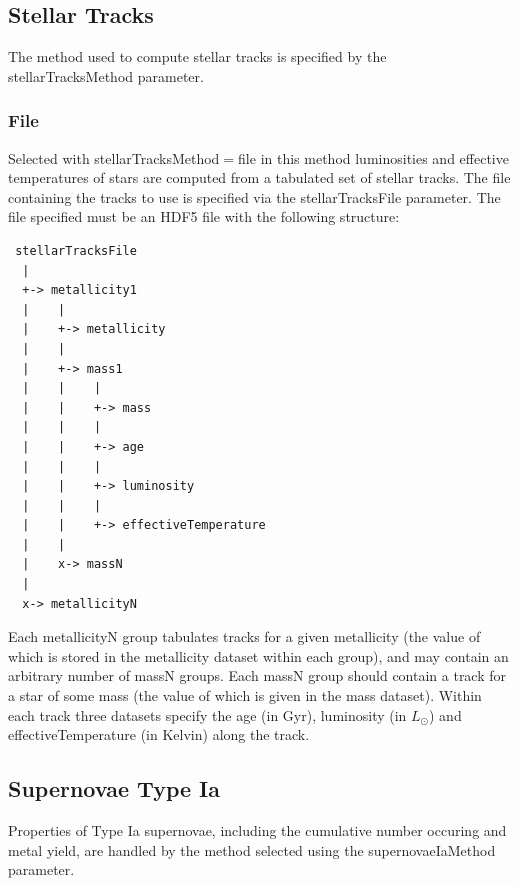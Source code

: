 \subsection{Stellar Tracks}

The method used to compute stellar tracks is specified by the {\normalfont \ttfamily stellarTracksMethod} parameter.

\subsubsection{File}\label{sec:StellarTracksFile}

Selected with {\normalfont \ttfamily stellarTracksMethod}$=${\normalfont \ttfamily file} in this method luminosities and effective temperatures of stars are computed from a tabulated set of stellar tracks. The file containing the tracks to use is specified via the {\normalfont \ttfamily stellarTracksFile} parameter. The file specified must be an HDF5 file with the following structure:
\begin{verbatim}
 stellarTracksFile
  |
  +-> metallicity1
  |    |
  |    +-> metallicity
  |    |
  |    +-> mass1
  |    |    |
  |    |    +-> mass
  |    |    |
  |    |    +-> age
  |    |    |
  |    |    +-> luminosity
  |    |    |
  |    |    +-> effectiveTemperature
  |    |
  |    x-> massN
  |
  x-> metallicityN
\end{verbatim}
Each {\normalfont \ttfamily metallicityN} group tabulates tracks for a given metallicity (the value of which is stored in the {\normalfont \ttfamily metallicity} dataset within each group), and may contain an arbitrary number of {\normalfont \ttfamily massN} groups. Each {\normalfont \ttfamily massN} group should contain a track for a star of some mass (the value of which is given in the {\normalfont \ttfamily mass} dataset). Within each track three datasets specify the {\normalfont \ttfamily age} (in Gyr), {\normalfont \ttfamily luminosity} (in $L_\odot$) and {\normalfont \ttfamily effectiveTemperature} (in Kelvin) along the track.

\subsection{Supernovae Type Ia}

Properties of Type Ia supernovae, including the cumulative number occuring and metal yield, are handled by the method selected using the {\normalfont \ttfamily supernovaeIaMethod} parameter.

